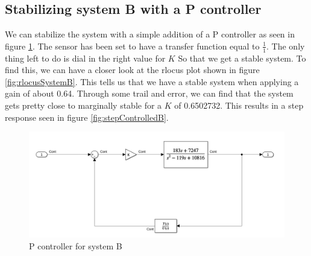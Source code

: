 \documentclass[a4paper,kul]{kulakarticle} %
\begin{document}
		\newpage
		\subsection{Stabilizing system B with a P controller}
			\label{sec:PcontrollerSystemB}
			We can stabilize the system with a simple addition of a P controller as seen in figure \ref{fig:PcontrollerSystemB}. The sensor has been set to have a transfer function equal to $\frac{1}{1}$. The only thing left to do is dial in  the right value for $K$ So that we get a stable system. To find this, we can have a closer look at the rlocus plot shown in figure \ref{fig:rlocusSystemB}. This tells us that we have a stable system when applying a gain of about \num{0.64}. Through some trail and error, we can find that the system gets pretty close to marginally stable for a $K$ of \num{0.6502732}. This results in a step response seen in figure \ref{fig:stepControlledB}. 
			\begin{figure}[h]
				\centering
				\includegraphics[width=0.7\linewidth]{PcontrollerSystemB}
				\caption[P controller system B]{P controller for system B}
				\label{fig:PcontrollerSystemB}
			\end{figure}
\end{document}
